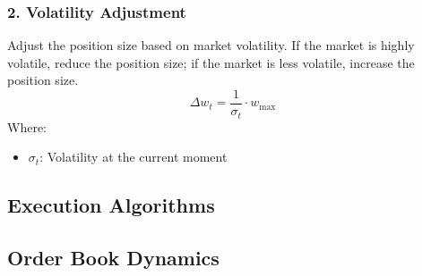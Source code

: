 \documentclass[12pt, oneside]{article}
\numberwithin{equation}{section}
\begin{document}
\subsubsection*{2. Volatility Adjustment}

Adjust the position size based on market volatility. If the market is highly volatile, reduce the position size; if the market is less volatile, increase the position size.
\[
\Delta w_t = \frac{1}{\sigma_t} \cdot w_{\text{max}}
\]
Where:
\begin{itemize}
    \item \( \sigma_t \): Volatility at the current moment
\end{itemize}



\subsection{Execution Algorithms}

\subsection{Order Book Dynamics}
\end{document}
